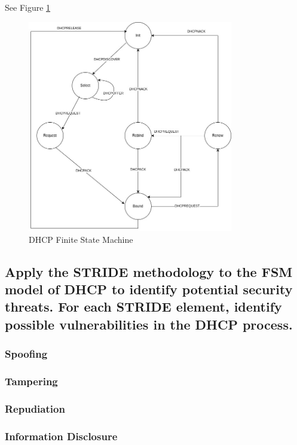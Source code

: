\documentclass{article}
\begin{document}
See Figure \ref{fig:dhcp_fsm}

\begin{figure}[h]
    \centering
    \includegraphics[width=0.8\textwidth]{task2/DHCP_FSM.jpg}
    \caption{DHCP Finite State Machine}
    \label{fig:dhcp_fsm}
\end{figure}

\subsection{Apply the STRIDE methodology to the FSM model of DHCP to identify potential security threats.
For each STRIDE element, identify possible vulnerabilities in the DHCP process.}

\subsubsection{Spoofing}

\subsubsection{Tampering}

\subsubsection{Repudiation}

\subsubsection{Information Disclosure}
\end{document}
